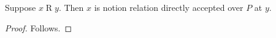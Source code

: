 

\begin{proposition}\label{notion_relation_dynamic_negative}
    Suppose $x\mathrel{R}y$.
    Then $x$ is notion relation directly accepted over $P$ at $y$.
\end{proposition}
\begin{proof}
    Follows.
\end{proof}
